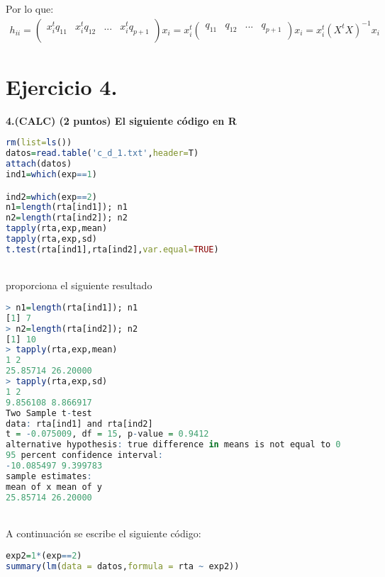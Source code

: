 \documentclass[12pt,spanish]{article}
\begin{document}
Por lo que: \\

\begin{equation}
		\begin{aligned}
	h_{ii} = %
\begin{pmatrix}
 x^t_i q_{11} &  x^t_i q_{12}&. . .& x^t_i q_{p+1} \\
\end{pmatrix}
% 
 x_i =  x^t_i %
\begin{pmatrix}
 q_{11} &  q_{12}&. . .& q_{p+1} \\
\end{pmatrix}
%  
 x_i =  x_i^t (X^t X)^{-1} x_i

 	\end{aligned}
	\end{equation}
	

\part*{Ejercicio 4.}	
		\textbf{4.(CALC) (2 puntos) El siguiente código en R}\\
\begin{lstlisting}[language=R]
rm(list=ls())
datos=read.table('c_d_1.txt',header=T)
attach(datos)
ind1=which(exp==1)

ind2=which(exp==2)
n1=length(rta[ind1]); n1
n2=length(rta[ind2]); n2
tapply(rta,exp,mean)
tapply(rta,exp,sd)
t.test(rta[ind1],rta[ind2],var.equal=TRUE)
\end{lstlisting}	
\\
proporciona el siguiente resultado\\


\begin{lstlisting}[language=R]
> n1=length(rta[ind1]); n1
[1] 7
> n2=length(rta[ind2]); n2
[1] 10
> tapply(rta,exp,mean)
1 2
25.85714 26.20000
> tapply(rta,exp,sd)
1 2
9.856108 8.866917
Two Sample t-test
data: rta[ind1] and rta[ind2]
t = -0.075009, df = 15, p-value = 0.9412
alternative hypothesis: true difference in means is not equal to 0
95 percent confidence interval:
-10.085497 9.399783
sample estimates:
mean of x mean of y
25.85714 26.20000
\end{lstlisting}
\\
A continuación se escribe el siguiente código:\\

\begin{lstlisting}[language=R]
exp2=1*(exp==2)
summary(lm(data = datos,formula = rta ~ exp2))
\end{lstlisting}
\end{document}
